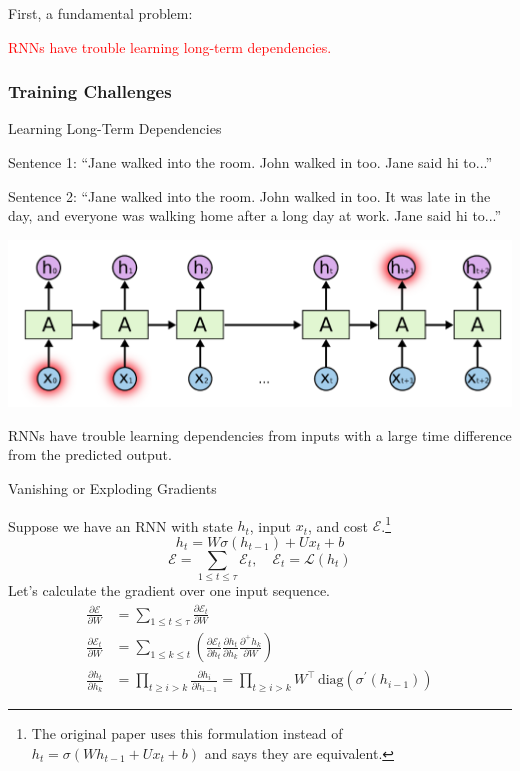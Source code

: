 \documentclass[english]{article}
\begin{document}
First, a fundamental problem: \begin{center}\textcolor{red}{RNNs have trouble learning long-term dependencies.}\end{center}
 \eenum

\subsubsection{Training Challenges}
\benum
\item 
 {Learning Long-Term Dependencies}

Sentence 1: ``Jane walked into the room. John walked in too. Jane said hi to...'' 

Sentence 2: ``Jane walked into the room. John walked in too. It was late in the day, and everyone was walking home after a long day at work. Jane said hi to...'' 

\begin{center}
\includegraphics[height=0.25\linewidth]{rnn-long-term.png} 
\end{center}

RNNs have trouble learning dependencies from inputs with a large time difference from the predicted output.
 

\item 
 {Vanishing or Exploding Gradients}

Suppose we have an RNN with state $h_t$, input $x_t$, and cost $\mathcal{E}$.\footnote{The original paper uses this formulation instead of $h_t=\sigma(Wh_{t-1}+Ux_t+b)$ and says they are equivalent.}
$$h_t = W\sigma(h_{t-1})+Ux_t+b$$
$$\mathcal{E}=\sum_{1\leq t\leq \tau}\mathcal{E}_t,\quad \mathcal{E}_t=\mathcal{L}(h_t)$$
Let's calculate the gradient over one input sequence.
\begin{align*}
\frac{\partial\mathcal{E}}{\partial W} &= \sum_{1\leq t\leq\tau} \frac{\partial\mathcal{E}_t}{\partial W}\\
\frac{\partial\mathcal{E}_t}{\partial W} &= \sum_{1\leq k \leq t} \left(\frac{\partial\mathcal{E}_t}{\partial h_t}\frac{\partial h_t}{\partial h_k}\frac{\partial^+h_k}{\partial W}\right)\\
\frac{\partial h_t}{\partial h_k} &= \prod_{t\geq i>k}\frac{\partial h_i}{\partial h_{i-1}}=\prod_{t\geq i>k} {W}^\top\,\text{diag}(\sigma^\prime(h_{i-1}))
\end{align*}
 
\end{document}
